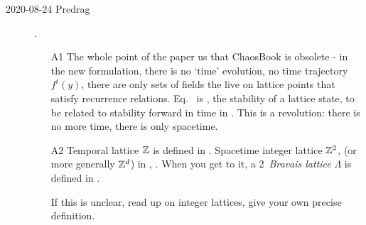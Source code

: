 \begin{description}
\item[2020-08-24 Predrag].

\begin{itemize}
  \item[A1]
The whole point of the paper us that ChaosBook is obsolete - in the new
formulation, there is no `time' evolution, no time trajectory $f^t(y)$,
there are only sets of fields the live on lattice points that satisfy
recurrence relations. Eq.~ is \emph{\jacobianOrb}, the
stability of a lattice state, to be related to stability forward in time
in . This is a revolution: there is no more time, there
is only spacetime.
  \item[A2]
Temporal lattice $\mathbb{Z}$ is defined in . Spacetime
integer lattice $\mathbb{Z}^2$, (or more generally $\mathbb{Z}^d$) in
, .
When you get to it, a 2\dmn\ \emph{Bravais lattice} $\Lambda$ is defined
in .

If this is unclear, read up on integer lattices, give your own precise definition.
\end{itemize}


\end{description}
